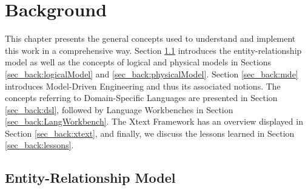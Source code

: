 \chapter{Background}
\label{chap:background}

This chapter presents the general concepts used to understand and implement this work in a comprehensive way.
Section \ref{sec_back:erModel} introduces the entity-relationship model as well as the concepts of logical and physical models in Sections \ref{sec_back:logicalModel} and \ref{sec_back:physicalModel}.
Section \ref{sec_back:mde} introduces Model-Driven Engineering and thus its associated notions.
The concepts referring to Domain-Specific Languages are presented in Section \ref{sec_back:dsl}, followed by Language Workbenches in Section \ref{sec_back:LangWorkbench}.
The Xtext Framework has an overview displayed in Section \ref{sec_back:xtext}, and finally, we discuss the lessons learned in Section \ref{sec_back:lessons}.

\section{Entity-Relationship Model}
\label{sec_back:erModel}

